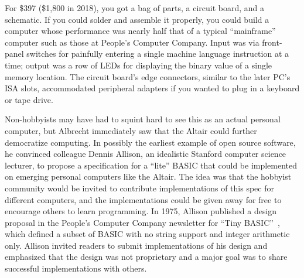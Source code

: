 For \$397 (\$1,800 in 2018), you got a bag of parts, a
circuit board, and a schematic.  If you could solder and assemble it properly, you 
could build a computer whose performance was nearly half that of a typical
``mainframe'' computer such as those at People's Computer Company.
Input was via
front-panel switches for painfully entering a
single machine language instruction at a time; output was a row of  LEDs for
displaying the binary value of a single memory location.  The circuit board's
edge connectors, similar to the later PC's ISA slots, accommodated 
peripheral adapters if you wanted to plug in a keyboard or tape drive.


Non-hobbyists may have had to squint
hard to see this as an actual personal computer,
but Albrecht
immediately saw that the Altair could  further democratize computing.
In possibly the earliest example of open source software, he
convinced colleague Dennis Allison, an idealistic Stanford computer
science lecturer, to propose a specification for a ``lite'' BASIC that could
be implemented on emerging personal
computers like the Altair.
The idea was that the hobbyist community would be invited to contribute
implementations of this spec for different computers, and the
implementations could be given away for free to encourage others to
learn programming.
In 1975, Allison published a design proposal in the People's Computer
Company newsletter for ``Tiny
BASIC''~\cite{allison_tiny_basic}, which defined 
a subset of BASIC with no string support and integer arithmetic only.
Allison invited readers to submit implementations of his design and
emphasized that the design was not proprietary and a major goal was to
share successful implementations with others.


